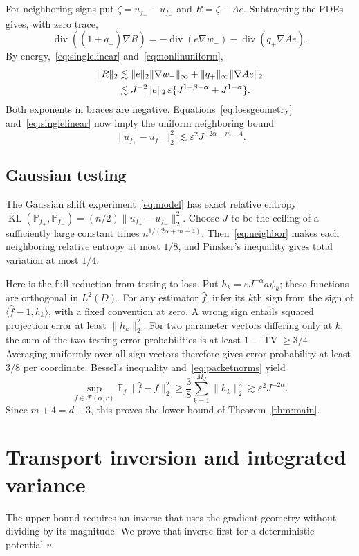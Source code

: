 \documentclass[11pt]{article}
\theoremstyle{remark}
\newcommand{\E}{\mathbb E}
\newcommand{\Prob}{\mathbb P}
\newcommand{\cF}{\mathcal F}
\newcommand{\diver}{\operatorname{div}}
\newcommand{\TV}{\operatorname{TV}}
\newcommand{\KL}{\operatorname{KL}}
\newcommand{\norm}[1]{\lVert #1\rVert}
\newcommand{\ip}[2]{\langle #1,#2\rangle}
\begin{document}
For neighboring signs put $\zeta=u_{f_+}-u_{f_-}$ and $R=\zeta-Ae$. Subtracting the PDEs gives, with zero trace,
\[
 \diver((1+q_+)\nabla R)
 =-\diver(e\nabla w_-)-\diver(q_+\nabla Ae).
\]
By energy,~\eqref{eq:singlelinear} and~\eqref{eq:nonlinuniform},
\begin{align}
 \norm R_2
 &\lesssim\norm e_2\norm{\nabla w_-}_\infty
       +\norm{q_+}_\infty\norm{\nabla Ae}_2\notag\\
 &\lesssim J^{-2}\norm e_2\,
 \varepsilon\{J^{1+\beta-\alpha}+J^{1-\alpha}\}.
 \label{eq:nonlinremainder}
\end{align}
Both exponents in braces are negative. Equations~\eqref{eq:lossgeometry} and~\eqref{eq:singlelinear} now imply the uniform neighboring bound
\begin{equation}\label{eq:neighbor}
 \norm{u_{f_+}-u_{f_-}}_2^2
 \lesssim\varepsilon^2J^{-2\alpha-m-4}.
\end{equation}

\subsection{Gaussian testing}
The Gaussian shift experiment~\eqref{eq:model} has exact relative entropy
$\KL(\Prob_{f_+},\Prob_{f_-})=(n/2)\norm{u_{f_+}-u_{f_-}}_2^2$.
Choose $J$ to be the ceiling of a sufficiently large constant times
$n^{1/(2\alpha+m+4)}$. Then~\eqref{eq:neighbor} makes each neighboring relative entropy at most $1/8$, and Pinsker's inequality gives total variation at most $1/4$.

Here is the full reduction from testing to loss. Put $h_k=\varepsilon J^{-\alpha}a\psi_k$; these functions are orthogonal in $L^2(D)$. For any estimator $\widehat f$, infer its $k$th sign from the sign of $\ip{\widehat f-1}{h_k}$, with a fixed convention at zero. A wrong sign entails squared projection error at least $\norm{h_k}_2^2$. For two parameter vectors differing only at $k$, the sum of the two testing error probabilities is at least $1-\TV\ge3/4$. Averaging uniformly over all sign vectors therefore gives error probability at least $3/8$ per coordinate. Bessel's inequality and~\eqref{eq:packetnorms} yield
\[
 \sup_{f\in\cF(\alpha,r)}\E_f\norm{\widehat f-f}_2^2
 \ge\frac38\sum_{k=1}^{M_J}\norm{h_k}_2^2
 \gtrsim\varepsilon^2J^{-2\alpha}.
\]
Since $m+4=d+3$, this proves the lower bound of Theorem~\ref{thm:main}.

\section{Transport inversion and integrated variance}\label{sec:transport}
The upper bound requires an inverse that uses the gradient geometry without dividing by its magnitude. We prove that inverse first for a deterministic potential $v$.
\end{document}
